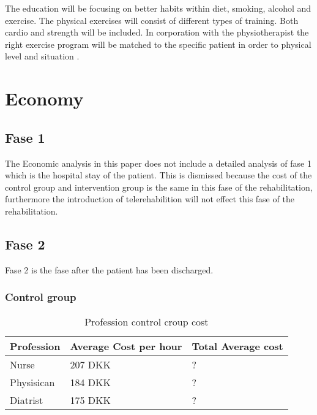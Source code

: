 The education will be focusing on better habits within diet, smoking, alcohol and exercise. The physical exercises will consist of different types of training. Both cardio and strength will be included. In corporation with the physiotherapist the right exercise program will be matched to the specific patient in order to physical level and situation \cite{herning}. 



\section{Economy}

\subsection{Fase 1}

The Economic analysis in this paper does not include a detailed analysis of fase 1 which is the hospital stay of the patient. This is dismissed because the cost of the control group and intervention group is the same in this fase of the rehabilitation, furthermore the introduction of telerehabilition will not effect this fase of the rehabilitation. 


\subsection{Fase 2}

Fase 2 is the fase after the patient has been discharged. 

\subsubsection{Control group}
\begin{table}[H]
\begin{longtabu} to 
    \textbf{Profession} &        \textbf{Average Cost per hour} & \textbf{Total Average cost} \\[-1ex]
    \midrule
     Nurse   &    207 DKK & ? \\ \hline
    Physisican   &   184 DKK    & ? \\ \hline
    Diatrist    &     175 DKK    & ?
    \newline
   \end{longtabu}
\caption{Profession control croup cost \cite{lonnurse, lonfys, londia}}
\label{tab: PC}
\end{table}

